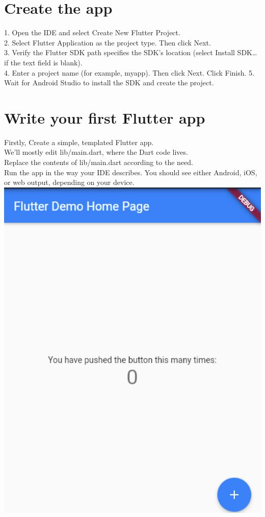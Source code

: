 \section{Create the app}
1. Open the IDE and select Create New Flutter Project.\\
2. Select Flutter Application as the project type. Then click Next.\\
3. Verify the Flutter SDK path specifies the SDK’s location (select Install SDK… if the text field is blank).\\
4. Enter a project name (for example, myapp). Then click Next.
Click Finish.
5. Wait for Android Studio to install the SDK and create the project.

\section{Write your first Flutter app}
Firstly, Create a simple, templated Flutter app.\\
We’ll mostly edit lib/main.dart, where the Dart code lives.\\
Replace the contents of lib/main.dart according to the need.\\
Run the app in the way your IDE describes. You should see either Android, iOS, or web output, depending on your device.\\

\includegraphics[width=16cm]{dart/flutterdemo.png}\\[0.5cm]
